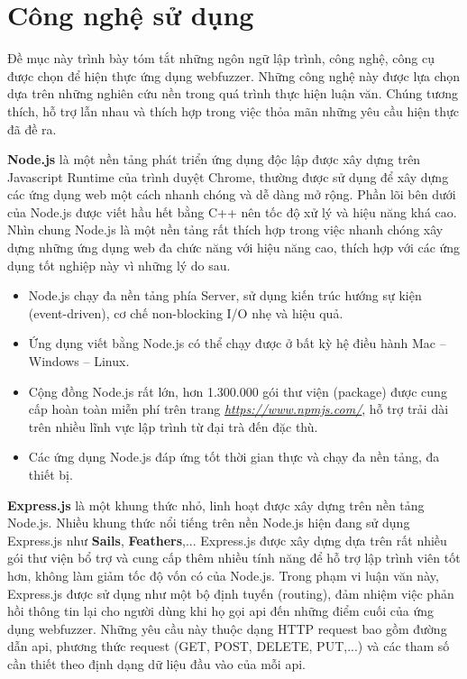 \section{Công nghệ sử dụng}
Đề mục này trình bày tóm tắt những ngôn ngữ lập trình, công nghệ, công cụ được chọn để hiện thực ứng dụng webfuzzer. Những công nghệ này được lựa chọn dựa trên những nghiên cứu nền trong quá trình thực hiện luận văn. Chúng tương thích, hỗ trợ lẫn nhau và thích hợp trong việc thỏa mãn những yêu cầu hiện thực đã đề ra.\par
\textbf{Node.js} là một nền tảng phát triển ứng dụng độc lập được xây dựng trên Javascript Runtime của trình duyệt Chrome, thường được sử dụng để xây dựng các ứng dụng web một cách nhanh chóng và dễ dàng mở rộng. Phần lõi bên dưới của Node.js được viết hầu hết bằng C++ nên tốc độ xử lý và hiệu năng khá cao. Nhìn chung Node.js là một nền tảng rất thích hợp trong việc nhanh chóng xây dựng những ứng dụng web đa chức năng với hiệu năng cao, thích hợp với các ứng dụng tốt nghiệp này vì những lý do sau.
\begin{itemize}
    \item Node.js chạy đa nền tảng phía Server, sử dụng kiến trúc hướng sự kiện (event-driven), cơ chế non-blocking I/O nhẹ và hiệu quả.
    \item Ứng dụng viết bằng Node.js có thể chạy được ở bất kỳ hệ điều hành Mac – Windows – Linux.
    \item Cộng đồng Node.js rất lớn, hơn 1.300.000 gói thư viện (package) được cung cấp hoàn toàn miễn phí trên trang \href{https://www.npmjs.com/}{\textit{https://www.npmjs.com/}}, hỗ trợ trải dài trên nhiều lĩnh vực lập trình từ đại trà đến đặc thù.
    \item Các ứng dụng Node.js đáp ứng tốt thời gian thực và chạy đa nền tảng, đa thiết bị.
\end{itemize}
\textbf{Express.js} là một khung thức nhỏ, linh hoạt được xây dựng trên nền tảng Node.js. Nhiều khung thức nổi tiếng trên nền Node.js hiện đang sử dụng Express.js như \textbf{Sails}, \textbf{Feathers},... Express.js được xây dựng dựa trên rất nhiều gói thư viện bổ trợ và cung cấp thêm nhiều tính năng để hỗ trợ lập trình viên tốt hơn, không làm giảm tốc độ vốn có của Node.js. Trong phạm vi luận văn này, Express.js được sử dụng như một bộ định tuyến (routing), đảm nhiệm việc phản hồi thông tin lại cho người dùng khi họ gọi \acrshort{api} đến những điểm cuối của ứng dụng webfuzzer. Những yêu cầu này thuộc dạng HTTP request bao gồm đường dẫn \acrshort{api}, phương thức request (GET, POST, DELETE, PUT,...) và các tham số cần thiết theo định dạng dữ liệu đầu vào của mỗi \acrshort{api}. \par
